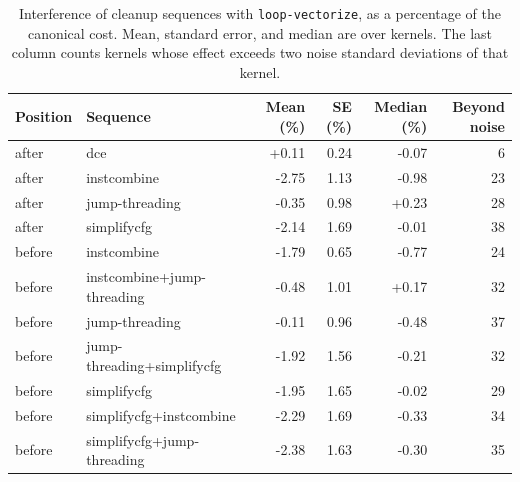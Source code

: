 \begin{table}[t]
\centering
\caption{Interference of cleanup sequences with \texttt{loop-vectorize}, as a percentage of the canonical cost. Mean, standard error, and median are over kernels. The last column counts kernels whose effect exceeds two noise standard deviations of that kernel.}
\label{tab:r5}
\setlength{\tabcolsep}{3pt}
\begin{tabular}{|l|l|r|r|r|r|}
\hline
Position & Sequence & Mean (\%) & SE (\%) & Median (\%) & Beyond noise \\
\hline
after & dce & +0.11 & 0.24 & -0.07 & 6 \\
\hline
after & instcombine & -2.75 & 1.13 & -0.98 & 23 \\
\hline
after & jump-threading & -0.35 & 0.98 & +0.23 & 28 \\
\hline
after & simplifycfg & -2.14 & 1.69 & -0.01 & 38 \\
\hline
before & instcombine & -1.79 & 0.65 & -0.77 & 24 \\
\hline
before & instcombine+jump-threading & -0.48 & 1.01 & +0.17 & 32 \\
\hline
before & jump-threading & -0.11 & 0.96 & -0.48 & 37 \\
\hline
before & jump-threading+simplifycfg & -1.92 & 1.56 & -0.21 & 32 \\
\hline
before & simplifycfg & -1.95 & 1.65 & -0.02 & 29 \\
\hline
before & simplifycfg+instcombine & -2.29 & 1.69 & -0.33 & 34 \\
\hline
before & simplifycfg+jump-threading & -2.38 & 1.63 & -0.30 & 35 \\
\hline
\end{tabular}
\end{table}
